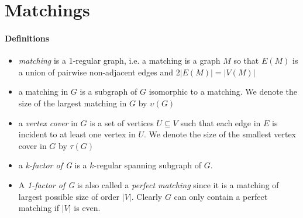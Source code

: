 \section{Matchings}

\paragraph{Definitions} 
\begin{itemize}
    \item \textit{matching} is a 1-regular graph, i.e. a matching is a graph $ M $ 
    so that $ E(M) $ is a union of pairwise non-adjacent edges and $ 2|E(M)| = |V(M)|$

    \item a matching in $ G $ is a subgraph of $ G $ isomorphic to a matching. We 
    denote the size of the largest matching in $ G $ by $ \upsilon(G) $

    \item a \textit{vertex cover} in $ G $ is a set of vertices $ U \subseteq V $ 
    such that each edge in $ E $ is incident to at least one vertex in $ U $.
    We denote the size of the smallest vertex cover in $ G $ by $ \tau(G) $

    \item a \textit{k-factor of G} is a $k$-regular spanning subgraph of $ G$.

    \item A \textit{1-factor of G} is also called a \textit{perfect matching} 
    since it is a matching of largest possible size of order $ |V| $. Clearly
    $ G $ can only contain a perfect matching if $ |V| $ is even.
\end{itemize}

